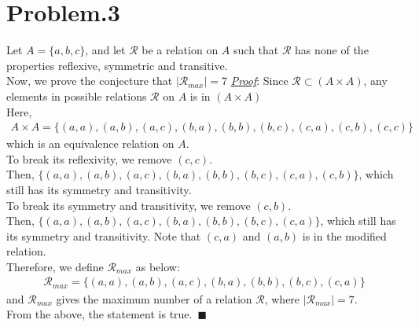 \documentclass[12pt]{article}
\begin{document}
\section*{Problem.3}
Let $A = \{a, b, c\}$, and let $\mathcal{R}$ be a relation on $A$ such that $\mathcal{R}$ has none of the properties reflexive, symmetric and transitive.\\[1em]
Now, we prove the conjecture that $|\mathcal{R}_{max}| = 7$
\underline{\textit{Proof}}: Since $\mathcal{R} \subset \left( A \times A \right)$, any elements in possible relations $\mathcal{R}$ on $A$ is in $\left( A \times A \right)$\\[1em]
Here,
\begin{gather*}
A \times A = \{ (a,a),(a,b),(a,c),(b,a),(b,b),(b,c),(c,a),(c,b),(c,c) \}
\end{gather*}
which is an equivalence relation on $A$.\\
To break its reflexivity, we remove $(c,c)$.\\
Then, $\{ (a,a),(a,b),(a,c),(b,a),(b,b),(b,c),(c,a),(c,b) \}$, which still has its symmetry and transitivity.\\
To break its symmetry and transitivity, we remove $(c,b)$.\\
Then, $\{ (a,a),(a,b),(a,c),(b,a),(b,b),(b,c),(c,a) \}$, which still has its symmetry and transitivity. Note that $(c,a)$ and $(a,b)$ is in the modified relation.\\
Therefore, we define $\mathcal{R}_{max}$ as below:
\begin{gather*}
\mathcal{R}_{max} = \{ (a,a),(a,b),(a,c),(b,a),(b,b),(b,c),(c,a) \}
\end{gather*}
and $\mathcal{R}_{max}$ gives the maximum number of a relation $\mathcal{R}$, where $|\mathcal{R}_{max}| = 7$.\\[1em]
From the above, the statement is true.~$\blacksquare$
\end{document}
